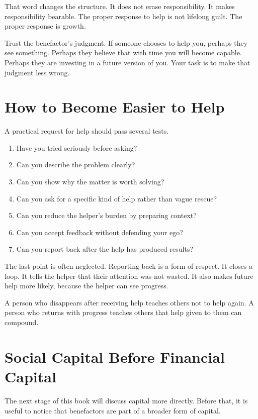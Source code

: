 That word changes the structure. It does not erase responsibility. It makes responsibility bearable. The proper response to help is not lifelong guilt. The proper response is growth.

Trust the benefactor's judgment. If someone chooses to help you, perhaps they see something. Perhaps they believe that with time you will become capable. Perhaps they are investing in a future version of you. Your task is to make that judgment less wrong.

\section*{How to Become Easier to Help}

A practical request for help should pass several tests.

\begin{enumerate}
\item Have you tried seriously before asking?
\item Can you describe the problem clearly?
\item Can you show why the matter is worth solving?
\item Can you ask for a specific kind of help rather than vague rescue?
\item Can you reduce the helper's burden by preparing context?
\item Can you accept feedback without defending your ego?
\item Can you report back after the help has produced results?
\end{enumerate}

The last point is often neglected. Reporting back is a form of respect. It closes a loop. It tells the helper that their attention was not wasted. It also makes future help more likely, because the helper can see progress.

A person who disappears after receiving help teaches others not to help again. A person who returns with progress teaches others that help given to them can compound.

\section*{Social Capital Before Financial Capital}

The next stage of this book will discuss capital more directly. Before that, it is useful to notice that benefactors are part of a broader form of capital.

